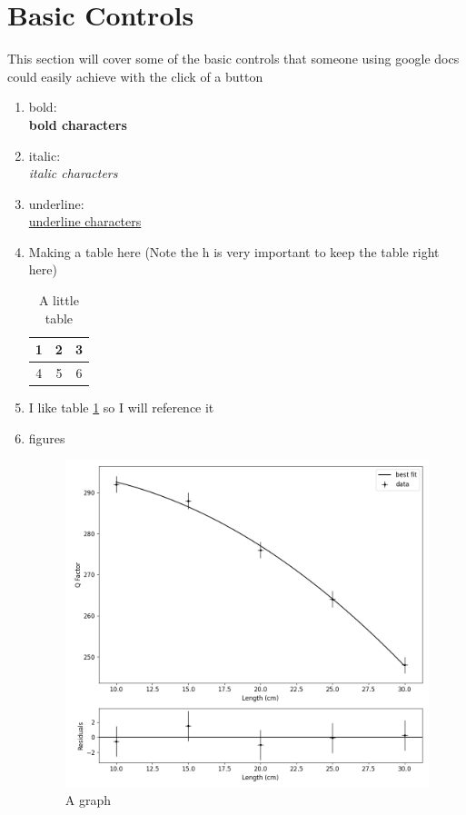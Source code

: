 \documentclass{article}
\begin{document}
\section{Basic Controls}
This section will cover some of the basic controls that someone using google docs could easily achieve with the click of a button

\begin{enumerate}
\item bold:\\
\textbf{bold characters}

\item italic:\\
\textit{italic characters}

\item underline:\\
\underline{underline characters}

\item Making a table here (Note the h is very important to keep the table right here)

\begin{table}[h]
\caption{A little table}
\label{little table}
\begin{center}
\begin{tabular}{|c|c|c|}
	\hline
	1 & 2 & 3\\\hline
	4 & 5 & 6\\\hline
\end{tabular}
\end{center}
\end{table}

\item I like table \ref{little table} so I will reference it\\ 

\item figures
\begin{figure}[h]
	\centering
	\includegraphics[scale=0.2]{graph.png}
	\caption{A graph}
	\label{fig:myLabel}
\end{figure}


\end{enumerate}
\end{document}
